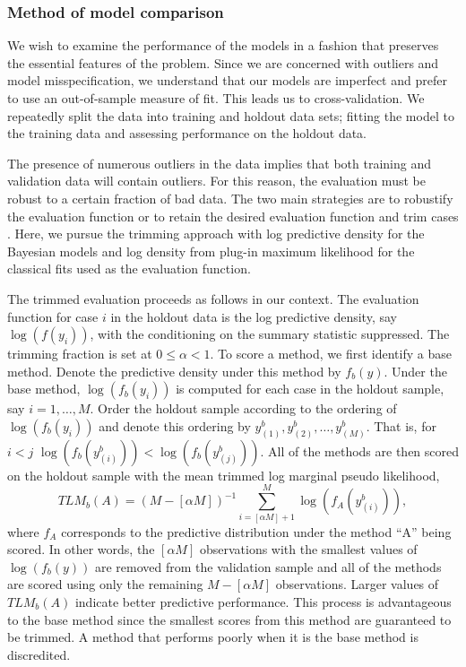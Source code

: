 \documentclass[ba]{imsart}
\begin{document}
\subsubsection{Method of model comparison}
We wish to examine the performance of the models in a fashion that preserves the essential features of the 
problem.  Since we are concerned with outliers and model 
misspecification, we understand that our models are imperfect and prefer to use an out-of-sample measure of fit.  
This leads us to cross-validation.  We repeatedly split the data into training
and holdout data sets; fitting the model to the training data and assessing performance on the holdout data.  

The presence of numerous outliers in the data implies that both training and validation data will contain 
outliers.  For this reason, the evaluation must be robust to a certain fraction of bad data.  
The two main strategies are to robustify the evaluation function \citep[e.g.,][]{ronchetti1997} or 
to retain the desired evaluation function and trim cases \citep{jung2014}.  Here,
we pursue the trimming approach with log predictive density for the Bayesian models and log density from plug-in 
maximum likelihood for the classical fits used as the evaluation function.

The trimmed evaluation proceeds as follows in our context.  The evaluation function for case $i$ in the holdout data
is the log predictive density, say
$\log(f(y_i))$, with the conditioning on the 
summary statistic suppressed.  The trimming 
fraction is set at $0 \leq \alpha < 1$. To score a method,
we first identify a base method. Denote the predictive density under this method by $f_{b}(y)$.  Under the base method, $\log(f_{b}(y_i))$ is computed for each case in the 
holdout sample, say $i = 1, \ldots, M$.  Order the holdout sample according to the ordering of $\log(f_{b}(y_i))$ and denote this
ordering by $y_{(1)}^b, y_{(2)}^b, \dots, y_{(M)}^b$. That is, for $i<j$
$\log(f_{b}(y_{(i)}^b))<\log(f_{b}(y_{(j)}^b))$. All of the methods are then scored on the holdout sample with the mean trimmed log marginal pseudo likelihood, 
\[TLM_b(A) = (M - [\alpha M])^{-1} \sum_{i=[\alpha M]+1}^{M}
    \log(f_A(y_{(i)}^b)),\]
 where $f_A$ corresponds to the predictive
 distribution under the method ``A'' being scored.  In other words, the $[\alpha M]$ observations with the smallest values of $\log(f_{b}(y))$ are 
removed from the validation sample and all of the methods are scored using only the
remaining $M - [\alpha M]$ observations. Larger values of $TLM_b(A)$ indicate better predictive performance. This process is advantageous to the base method since the smallest scores from this method are guaranteed to be trimmed.  A method
that performs poorly when it is the base method is discredited.  %
\end{document}
